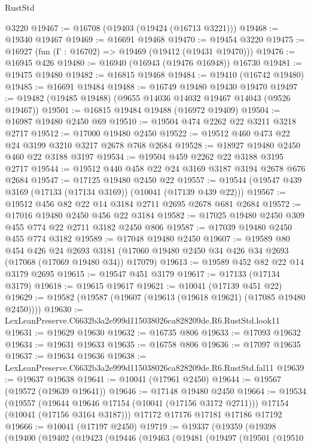 \begin{lexlean}{RustStd}
\begin{coremodule}
    @3220
@19467 := @16708 (@19403 (@19424 (@16713 @3221)))
@19468 := @19340 @19467
@19469 := @16691 @19468
@19470 := @19454 @3220
@19475 := @16927 (fun (Γ : @16702) => @19469 (@19412 (@19431 @19470)))
@19476 := @16945 @426
@19480 := @16940 (@16943 (@19476 @16948)) @16730
@19481 := @19475 @19480
@19482 := @16815 @19468
@19484 := @19410 (@16742 @19480)
@19485 := @16691 @19484
@19488 := @16749 @19480 @19430 @19470
@19497 := @19482 (@19485 @19488) (@9655 @14036 @14032 @19467 @14043 (@9526 @19467))
@19501 := @16815 @19484 @19488 (@16972 @19409)
@19504 := @16987 @19480 @2450 @69
@19510 := @19504 @474 @2262 @22 @3211 @3218 @2717
@19512 := @17000 @19480 @2450
@19522 := @19512 @460 @473 @22 @24 @3199 @3210 @3217 @2678 @768 @2684
@19528 := @18927 @19480 @2450 @460 @22 @3188 @3197
@19534 := @19504 @459 @2262 @22 @3188 @3195 @2717
@19544 := @19512 @440 @458 @22 @24 @3169 @3187 @3194 @2678 @676 @2684
@19547 := @17125 @19480 @2450 @22
@19557 := @19544 (@19547 @439 @3169 (@17133 (@17134 @3169)) (@10041 (@17139 @439 @22)))
@19567 := @19512 @456 @82 @22 @14 @3184 @2711 @2695 @2678 @681 @2684
@19572 := @17016 @19480 @2450 @456 @22 @3184
@19582 := @17025 @19480 @2450 @309 @455 @774 @22 @2711 @3182 @2450 @806
@19587 := @17039 @19480 @2450 @455 @774 @3182
@19589 := @17048 @19480 @2450
@19607 := @19589
    @80
    @454
    @426
    @24
    @2693
    @3181
    (@17060 @19480 @2450 @34 @426 @34 @2693 (@17068 (@17069 @19480 @34)) @17079)
@19613 := @19589 @452 @82 @22 @14 @3179 @2695
@19615 := @19547 @451 @3179
@19617 := @17133 (@17134 @3179)
@19618 := @19615 @19617
@19621 := @10041 (@17139 @451 @22)
@19629 := @19582 (@19587 (@19607 (@19613 (@19618 @19621) (@17085 @19480 @2450))))
@19630 := LexLeanPreserve.C6632b3a2e999d115038026ca828209de.R6.RustStd.look11
@19631 := @19629 @19630
@19632 := @16735 @806
@19633 := @17093 @19632
@19634 := @19631 @19633
@19635 := @16758 @806
@19636 := @17097 @19635
@19637 := @19634 @19636
@19638 := LexLeanPreserve.C6632b3a2e999d115038026ca828209de.R6.RustStd.fal11
@19639 := @19637 @19638
@19641 := @10041 (@17961 @2450)
@19644 := @19567 (@19572 (@19639 @19641))
@19646 := @17148 @19480 @2450
@19664 := @19534
    (@19557
      (@19644 @19646 @17154 (@10041 (@17156 @3172 @2711)))
      @17154
      (@10041 (@17156 @3164 @3187)))
    @17172
    @17176
    @17181
    @17186
    @17192
@19666 := @10041 (@17197 @2450)
@19719 := @19337
    (@19359
      (@19398
        (@19400
          (@19402
            (@19423
              (@19446
                (@19463
                  (@19481
                    (@19497
                      (@19501
                        (@19510

\end{coremodule}
\end{lexlean}
